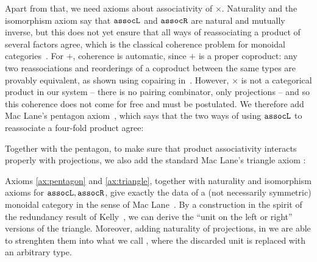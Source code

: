 Apart from that, we need axioms about associativity of $\times$. Naturality and the isomorphism axiom say that $\mathtt{assocL}$ and $\mathtt{assocR}$ are natural and mutually inverse, but this does not yet ensure that all ways of reassociating a product of several factors agree, which is the classical coherence problem for monoidal categories~\cite{MacLane1963}. For $+$, coherence is automatic, since $+$ is a proper coproduct: any two reassociations and reorderings of a coproduct between the same types are provably equivalent, as shown using copairing in~. However, $\times$ is not a categorical product in our system -- there is no pairing combinator, only projections -- and so this coherence does not come for free and must be postulated. We therefore add Mac Lane's pentagon axiom~\cite[VII.1(5)]{MacLane1971}, which says that the two ways of using $\mathtt{assocL}$ to reassociate a four-fold product agree:
\begin{axiom}\label{ax:pentagon}
\end{axiom}
Together with the pentagon, to make sure that product associativity interacts properly with projections, we also add the standard Mac Lane's triangle axiom \cite[VII.1(7)]{MacLane1971}:
\begin{axiom}\label{ax:triangle}
\end{axiom}
Axioms \ref{ax:pentagon} and \ref{ax:triangle}, together with naturality and isomorphism axioms for $\mathtt{assocL}, \mathtt{assocR}$, give exactly the data of a (not necessarily symmetric) monoidal category in the sense of Mac Lane~\cite[VII.1]{MacLane1971}. By a construction in the spirit of the redundancy result of Kelly~\cite{Kelly1964}, we can derive the ``unit on the left or right'' versions of the triangle. Moreover, adding naturality of projections, in  we are able to strenghten them into what we call , where the discarded unit is replaced with an arbitrary type.

